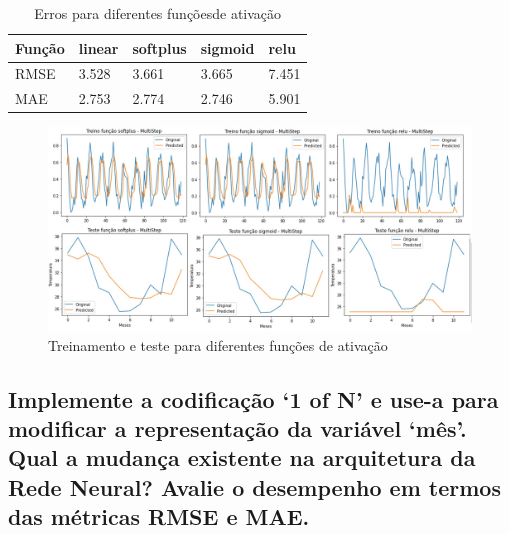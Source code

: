 \documentclass[12pt]{article}
\begin{document}
	\begin{table}[H]
		\centering
		\begin{tabular}{|l|l|l|l|l|}
			\hline
			Função & linear & softplus & sigmoid & relu  \\ \hline
			RMSE   & 3.528  & 3.661    & 3.665   & 7.451 \\ \hline
			MAE    & 2.753  & 2.774    & 2.746   & 5.901 \\ \hline
		\end{tabular}
		\caption{Erros para diferentes funçõesde ativação}
	\end{table}

	\begin{figure}[H]
		\centering
		\includegraphics[width=0.9\linewidth]{Imagens/topologias/InkedfuncoesAtivacao_LI}
		\caption{Treinamento e teste para diferentes funções de ativação}
		\label{fig:inkedfuncoesativacaoli}
	\end{figure}
	
	
	
	\subsection{Implemente a codificação ‘1 of N’ e use-a para modificar a representação da variável ‘mês’. Qual a mudança existente na arquitetura da Rede	Neural? Avalie o desempenho em termos das métricas RMSE e MAE.}
	

	 
	
\end{document}
